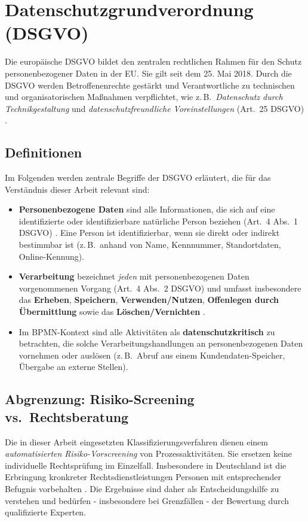 \section{Datenschutzgrundverordnung (DSGVO)}\label{sec:dsgvo}

Die europäische \acf{DSGVO} \cite{GDPR2016} bildet den zentralen rechtlichen Rahmen für den Schutz personenbezogener Daten in der \ac{EU}. Sie gilt seit dem 25. Mai 2018. Durch die \ac{DSGVO} werden Betroffenenrechte gestärkt und Verantwortliche zu technischen und organisatorischen Maßnahmen verpflichtet, wie z.\,B.\ \emph{Datenschutz durch Technikgestaltung} und \emph{datenschutzfreundliche Voreinstellungen} (Art.~25 DSGVO) \cite{gdpr-guidelines-2019}.

\subsection*{Definitionen}

Im Folgenden werden zentrale Begriffe der \ac{DSGVO} erläutert, die für das Verständnis dieser Arbeit relevant sind:

\begin{itemize}
    \item \textbf{Personenbezogene Daten} sind alle Informationen, die sich auf eine identifizierte oder identifizierbare natürliche Person beziehen (Art.~4 Abs.~1 DSGVO) \cite{GDPR2016}. Eine Person ist identifizierbar, wenn sie direkt oder indirekt bestimmbar ist (z.\,B.\ anhand von Name, Kennnummer, Standortdaten, Online-Kennung).
    \item \textbf{Verarbeitung} bezeichnet \emph{jeden} mit personenbezogenen Daten vorgenommenen Vorgang (Art.~4 Abs.~2 DSGVO) und umfasst insbesondere das \textbf{Erheben}, \textbf{Speichern}, \textbf{Verwenden/Nutzen}, \textbf{Offenlegen durch Übermittlung} sowie das \textbf{Löschen/Vernichten} \cite{GDPR2016}.
    \item Im \ac{BPMN}-Kontext sind alle Aktivitäten als \textbf{datenschutzkritisch} zu betrachten, die solche Verarbeitungshandlungen an personenbezogenen Daten vornehmen oder auslösen (z.\,B.\ Abruf aus einem Kundendaten-Speicher, Übergabe an externe Stellen).
\end{itemize}

\subsection*{Abgrenzung: Risiko-Screening vs.\ Rechtsberatung}

Die in dieser Arbeit eingesetzten Klassifizierungsverfahren dienen einem \emph{automatisierten Risiko-Vorscreening} von Prozessaktivitäten. Sie ersetzen keine individuelle Rechtsprüfung im Einzelfall. Insbesondere in Deutschland ist die Erbringung kronkreter Rechtsdienstleistungen Personen mit entsprechender Befugnis vorbehalten \cite{rdg-2007}. Die Ergebnisse sind daher als Entscheidungshilfe zu verstehen und bedürfen - insbesondere bei Grenzfällen - der Bewertung durch qualifizierte Experten.